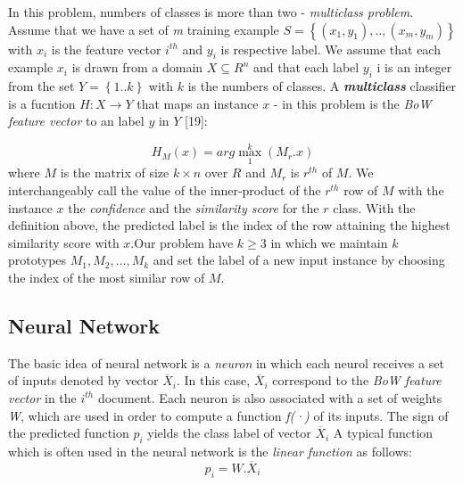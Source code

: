 \documentclass[conference]{IEEEtran}
\begin{document}
In this problem,  numbers of classes is more than two - \textit{multiclass problem}. Assume that we have a set of \textit{m} training example $S=\left \{ (x_1, y_1),..,(x_m, y_m) \right \}$
with $x_i$ is the feature vector $i^{th}$ and $y_i$ is respective label. We assume that each example $x_i$ is drawn from a domain $X\subseteq R^n$ and that each label $y_i$ i is an integer from the set $Y=\left \{ 1..k \right \}$ with $k$ is the numbers of classes. A \textbf{\textit{multiclass}} classifier is a fucntion $H:X\rightarrow Y$ that maps an instance $x$ - in this problem is the \textit{BoW feature vector} to an label $y$ in $Y$ [19]: 

\[H_M(x)=arg \max_{1}^{k}(M_r.x)\]
where $M$ is the matrix of size $k\times n$ over $R$ and $M_r$ is $r^{th}$ of $M$. We interchangeably
call the value of the inner-product of the $r^{th}$ row of $M$ with the instance $x$ the \textit{confidence}
and the \textit{similarity score} for the $r$ class. With the definition above,  the
predicted label is the index of the row attaining the highest similarity score with $x$.Our problem have $k\geq 3$ in which we maintain $k$ prototypes $M_1, M_2,..., M_k $ and set the label of a new input instance by choosing the index
of the most similar row of $M$.

\subsection{Neural Network}
The basic idea of neural network is a \textit{neuron} in which each neurol receives a set of inputs denoted by vector $\overline{X}_i$. In this case, $\overline{X}_i$ correspond to the \textit{BoW feature vector} in the $i^{th}$ document. Each neuron is also associated with a set of weights \textit{W}, which are used in order to compute a function \textit{f(·)} of its inputs. The sign of the predicted function $p_i$ yields the class label of vector $\overline{X}_i$ A typical function which is often used in the neural network is the \textit{linear function} as follows:
\[p_i=W.\overline{X}_i\]
\end{document}
